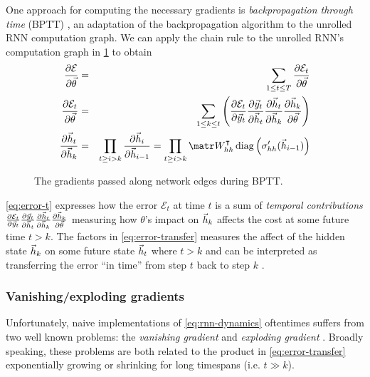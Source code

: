 One approach for computing the necessary gradients is \emph{backpropagation
through time} (BPTT) \citep{goller1996learning}, an adaptation of the backpropagation
algorithm \citep{linnainmaa1970representation,rumelhart1988learning} to the unrolled RNN computation
graph. We can apply the chain rule to the unrolled RNN's computation graph in
\cref{fig:rnn-bptt} to obtain
\begin{align}
    \frac{\pd \mathcal{E}}{\pd \vec{\theta}} &=& \sum_{1 \leq t \leq T} \frac{\pd \mathcal{E}_t}{\pd \vec{\theta}} \\
    \frac{\pd \mathcal{E}_t}{\pd \vec{\theta}} &=& \sum_{1 \leq k \leq t} \left(
        \frac{\pd \mathcal{E}_t}{\pd \y_t}
        \frac{\pd \y_t}{\pd \h_t}
        \frac{\pd \h_t}{\pd \h_k}
        \frac{\pd \h_k}{\pd \vec{\theta}}
    \right) \label{eq:error-t}\\
    \frac{\pd \h_t}{\pd \h_k} &=&
    \prod_{t \geq i > k} \frac{\pd \h_i}{\pd \h_{i-1}}
    = \prod_{t \geq i > k} \W_{hh}^\tp \diag \left( \sigma_{hh}'( \h_{i-1} ) \right)
    \label{eq:error-transfer}
\end{align}

\begin{figure}[htpb]
    \centering
    
    \caption{The gradients passed along network edges during BPTT.}
    \label{fig:rnn-bptt}
\end{figure}

\cref{eq:error-t} expresses how the error $\mathcal{E}_t$ at time $t$ is a sum
of \emph{temporal contributions} $
\frac{\partial \mathcal{E}_t}{\partial \vec{y}_t}
\frac{\partial \vec{y}_t}{\partial \vec{h}_t}
\frac{\partial \vec{h}_t}{\partial \vec{h}_k}
\frac{\partial \vec{h}_k}{\partial \vec{\theta}}$
measuring how $\theta$'s impact on $\vec{h}_k$ affects the cost at some future
time $t > k$. The factors in \cref{eq:error-transfer} measures the affect
of the hidden state $\vec{h}_k$ on some future state $\vec{h}_t$ where $t > k$
and can be interpreted as transferring the error ``in time'' from step $t$ back
to step $k$ \citep{Pascanu2012}.

\subsubsection{Vanishing/exploding gradients}

Unfortunately, naive implementations of \cref{eq:rnn-dynamics} oftentimes suffers from two well known problems: the
\emph{vanishing gradient} and \emph{exploding gradient} \citep{Bengio1994}.
Broadly speaking, these problems are both related to the product in
\cref{eq:error-transfer} exponentially growing or shrinking for long
timespans (i.e. $t \gg k$).

